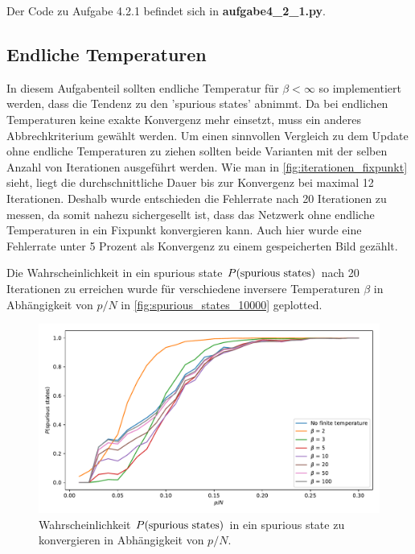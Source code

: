 Der Code zu Aufgabe 4.2.1 befindet sich in \textbf{aufgabe4\_2\_1.py}.

\subsection{Endliche Temperaturen}

In diesem Aufgabenteil sollten endliche Temperatur für $\beta < \infty$ so implementiert werden, dass die Tendenz zu den 'spurious states' abnimmt. Da bei endlichen Temperaturen keine exakte Konvergenz mehr einsetzt, muss ein anderes Abbrechkriterium gewählt werden. Um einen sinnvollen Vergleich zu dem Update ohne endliche Temperaturen zu ziehen sollten beide Varianten mit der selben Anzahl von Iterationen ausgeführt werden. Wie man in \autoref{fig:iterationen_fixpunkt} sieht, liegt die durchschnittliche Dauer bis zur Konvergenz bei maximal 12 Iterationen. Deshalb wurde entschieden die Fehlerrate nach 20 Iterationen zu messen, da somit nahezu sichergesellt ist, dass das Netzwerk ohne endliche Temperaturen in ein Fixpunkt konvergieren kann. Auch hier wurde eine Fehlerrate unter 5 Prozent als Konvergenz zu einem gespeicherten Bild gezählt.

Die Wahrscheinlichkeit in ein spurious state  $P(\textup{spurious states})$ nach 20 Iterationen zu erreichen wurde für verschiedene inversere Temperaturen $\beta$ in Abhängigkeit von $p/N$ in \autoref{fig:spurious_states_10000} geplotted. 

\begin{figure}[htp]
	\centering
	\includegraphics[width = \textwidth]{images/4_2_2/spurious_states_finite_temperature_100_100.pdf}
	\caption{Wahrscheinlichkeit $P(\textup{spurious states})$ in ein spurious state zu konvergieren in Abhängigkeit von $p/N$.}
	\label{fig:spurious_states_finite_temperature_100}
\end{figure}

